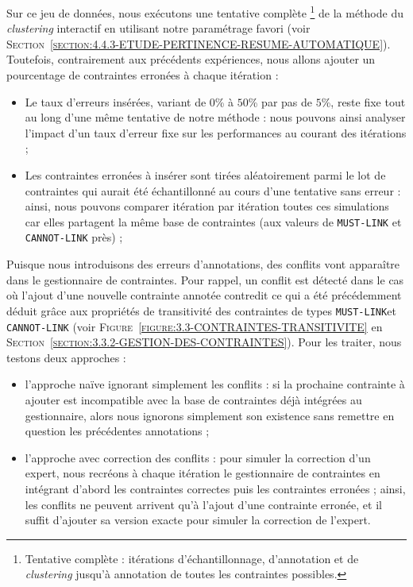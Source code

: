 			Sur ce jeu de données, nous exécutons une tentative complète
			\footnote{Tentative complète : itérations d'échantillonnage, d'annotation et de \textit{clustering} jusqu'à annotation de toutes les contraintes possibles.}
			de la méthode du \textit{clustering} interactif en utilisant notre paramétrage favori (voir \textsc{Section~\ref{section:4.4.3-ETUDE-PERTINENCE-RESUME-AUTOMATIQUE}}).
			Toutefois, contrairement aux précédents expériences, nous allons ajouter un pourcentage de contraintes erronées à chaque itération :
			\begin{itemize}
				\item Le taux d'erreurs insérées, variant de $0$\% à $50$\% par pas de $5$\%, reste fixe tout au long d'une même tentative de notre méthode : nous pouvons ainsi analyser l'impact d'un taux d'erreur fixe sur les performances au courant des itérations ;
				\item Les contraintes erronées à insérer sont tirées aléatoirement parmi le lot de contraintes qui aurait été échantillonné au cours d'une tentative sans erreur : ainsi, nous pouvons comparer itération par itération toutes ces simulations car elles partagent la même base de contraintes (aux valeurs de \texttt{MUST-LINK} et \texttt{CANNOT-LINK} près) ;
			\end{itemize}
			
			Puisque nous introduisons des erreurs d'annotations, des conflits vont apparaître dans le gestionnaire de contraintes.
			Pour rappel, un conflit est détecté dans le cas où l'ajout d'une nouvelle contrainte annotée contredit ce qui a été précédemment déduit grâce aux propriétés de transitivité des contraintes de types \texttt{MUST-LINK}et \texttt{CANNOT-LINK} (voir \textsc{Figure~\ref{figure:3.3-CONTRAINTES-TRANSITIVITE}} en \textsc{Section~\ref{section:3.3.2-GESTION-DES-CONTRAINTES}}).
			Pour les traiter, nous testons deux approches :
			\begin{itemize}
				\item l'approche naïve ignorant simplement les conflits : si la prochaine contrainte à ajouter est incompatible avec la base de contraintes déjà intégrées au gestionnaire, alors nous ignorons simplement son existence sans remettre en question les précédentes annotations ;
				\item l'approche avec correction des conflits : pour simuler la correction d'un expert, nous recréons à chaque itération le gestionnaire de contraintes en intégrant d'abord les contraintes correctes puis les contraintes erronées ; ainsi, les conflits ne peuvent arrivent qu'à l'ajout d'une contrainte erronée, et il suffit d'ajouter sa version exacte pour simuler la correction de l'expert.
			\end{itemize}
			
